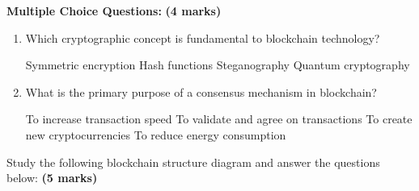\documentclass[11pt,a4paper]{exam}
\begin{document}
\vspace{0.3cm}
\begin{questions}

\question[4] \textbf{Multiple Choice Questions:} \hfill \textbf{(4 marks)}
\begin{enumerate}
\item Which cryptographic concept is fundamental to blockchain technology?
\begin{oneparchoices}
\choice Symmetric encryption
\choice Hash functions
\choice Steganography
\choice Quantum cryptography
\end{oneparchoices}

\item What is the primary purpose of a consensus mechanism in blockchain?
\begin{oneparchoices}
\choice To increase transaction speed
\choice To validate and agree on transactions
\choice To create new cryptocurrencies
\choice To reduce energy consumption
\end{oneparchoices}
\end{enumerate}

\question[5] Study the following blockchain structure diagram and answer the questions below: \hfill \textbf{(5 marks)}

\begin{center}
\end{center}


\end{questions}
\end{document}
